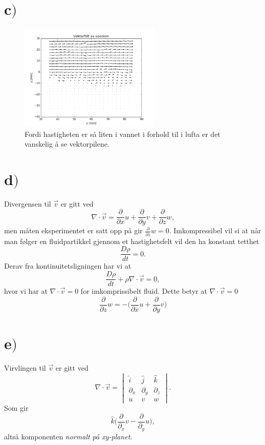 \documentclass{article}
\begin{document}
\section*{c$)$}
\begin{figure}[H]
\centering
\includegraphics[width=0.6\textwidth]{problem_c_1}
\caption{Fordi hastigheten er så liten i vannet i forhold til i lufta er det vanskelig å se vektorpilene.}
\label{fig:problem_b_vector_fig}
\end{figure}

\section*{d$)$}
Divergensen til $\vec{v}$ er gitt ved
\begin{equation}
\nabla\cdot\vec{v} = \frac{\partial}{\partial x}u + \frac{\partial}{\partial y}v + \frac{\partial}{\partial z}w,
\end{equation}
men måten eksperimentet er satt opp på gir $\frac{\partial}{\partial z}w = 0$.
Imkompressibel vil si at når man følger en fluidpartikkel gjennom et hastighetsfelt vil den ha konstant tetthet
\begin{equation}
\frac{D\rho}{dt} = 0.
\end{equation}
Derav fra kontinuitetsligningen har vi at
\begin{equation}
\frac{D\rho}{dt} + \rho\nabla\cdot\vec{v} = 0,
\end{equation}
hvor vi har at $\nabla\cdot\vec{v} = 0$ for imkomprissibelt fluid. Dette betyr at $\nabla\cdot\vec{v} = 0$
\begin{equation}
\frac{\partial}{\partial z}w = -\bigg(\frac{\partial}{\partial x}u + \frac{\partial}{\partial y}v\bigg)
\end{equation}

\section*{e$)$}
Virvlingen til $\vec{v}$ er gitt ved
\begin{equation}
\nabla\cdot\vec{v} = \begin{vmatrix}\hat{i}&\hat{j}&\hat{k}\\\partial_{x}&\partial_{y}&\partial_{z}\\u&v&w\end{vmatrix}. 
\end{equation}
Som gir
\begin{equation}
\hat{k}\bigg(\frac{\partial}{\partial_{x}}v - \frac{\partial}{\partial_{y}}u \bigg),
\end{equation}
altså komponenten \textit{normalt på xy-planet}.
\end{document}
